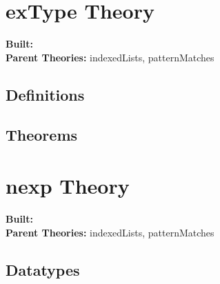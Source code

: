 \documentclass[11pt, twoside]{article}
\begin{document}



\tableofcontents
\cleardoublepage
\HOLpagestyle

\section{exType Theory}
\begin{flushleft}
\textbf{Built:} \HOLexTypeDate \\[2pt]
\textbf{Parent Theories:} indexedLists, patternMatches
\end{flushleft}


\subsection{Definitions}

\HOLexTypeDefinitions

\subsection{Theorems}

\HOLexTypeTheorems

\section{nexp Theory}
\begin{flushleft}
\textbf{Built:} \HOLnexpDate \\[2pt]
\textbf{Parent Theories:} indexedLists, patternMatches
\end{flushleft}

\subsection{Datatypes}
\end{document}
